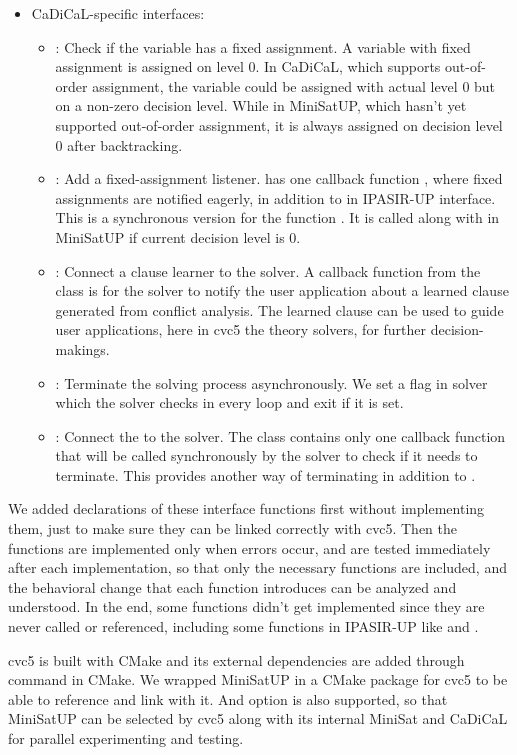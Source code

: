 \begin{itemize}
  \item CaDiCaL-specific interfaces:
  \begin{itemize}
    \item {}: Check if the variable has a fixed assignment. A variable with fixed assignment is assigned on level 0. In CaDiCaL, which supports out-of-order assignment, the variable could be assigned with actual level 0 but on a non-zero decision level. While in MiniSatUP, which hasn't yet supported out-of-order assignment, it is always assigned on decision level 0 after backtracking.
    \item {}: Add a fixed-assignment listener.  has one callback function , where fixed assignments are notified eagerly, in addition to  in IPASIR-UP interface. This is a synchronous version for the function . It is called along with  in MiniSatUP if current decision level is 0.
    \item {}: Connect a clause learner to the solver. A callback function  from the  class is for the solver to notify the user application about a learned clause generated from conflict analysis. The learned clause can be used to guide user applications, here in cvc5 the theory solvers, for further decision-makings.
    \item {}: Terminate the solving process asynchronously. We set a flag in solver which the solver checks in every loop and exit if it is set.
    \item {}: Connect the  to the solver. The  class contains only one callback function  that will be called synchronously by the solver to check if it needs to terminate. This provides another way of terminating in addition to .
  \end{itemize}
\end{itemize}

We added declarations of these interface functions first without implementing them, just to make sure they can be linked correctly with cvc5. Then the functions are implemented only when errors occur, and are tested immediately after each implementation, so that only the necessary functions are included, and the behavioral change that each function introduces can be analyzed and understood. In the end, some functions didn't get implemented since they are never called or referenced, including some functions in IPASIR-UP like  and .

cvc5 is built with CMake and its external dependencies are added through command  in CMake. We wrapped MiniSatUP in a CMake package for cvc5 to be able to reference and link with it. And option  is also supported, so that MiniSatUP can be selected by cvc5 along with its internal MiniSat and CaDiCaL for parallel experimenting and testing.
